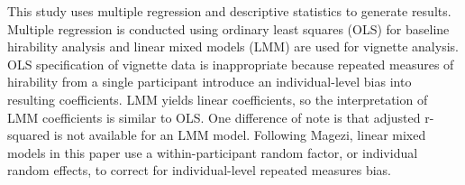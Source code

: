 \documentclass[review]{elsarticle}
\begin{document}
This study uses multiple regression and descriptive statistics to generate results.
Multiple regression is conducted using ordinary least squares (OLS)
for baseline hirability analysis
and linear mixed models (LMM)
are used for vignette analysis.
OLS specification of vignette data is inappropriate because repeated measures of hirability
from a single participant introduce an individual-level bias into resulting coefficients.
LMM yields linear coefficients, so the interpretation of LMM coefficients is similar to OLS.
One difference of note is that adjusted r-squared is not available for an LMM model.
Following Magezi\cite{magezi2015linear},
linear mixed models in this paper use a within-participant random factor,
or individual random effects,
to correct for individual-level repeated measures bias.

\end{document}
